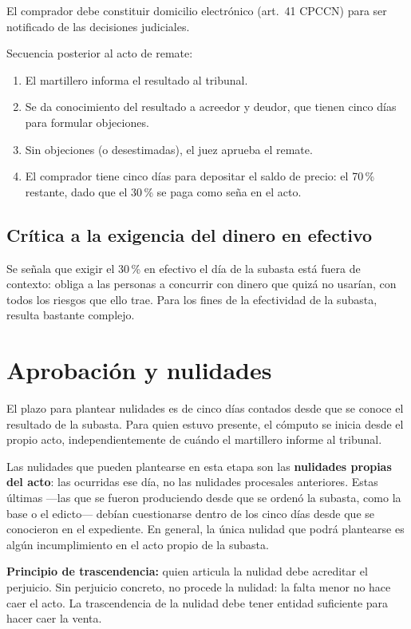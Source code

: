 \documentclass[12pt,oneside]{book}
\begin{document}
El comprador debe constituir domicilio electrónico (art.~41 CPCCN) para ser notificado de las decisiones judiciales.

Secuencia posterior al acto de remate:

\begin{enumerate}
    \item El martillero informa el resultado al tribunal.
    \item Se da conocimiento del resultado a acreedor y deudor, que tienen cinco días para formular objeciones.
    \item Sin objeciones (o desestimadas), el juez aprueba el remate.
    \item El comprador tiene cinco días para depositar el saldo de precio: el 70\,\% restante, dado que el 30\,\% se paga como seña en el acto.
\end{enumerate}

\subsection{Crítica a la exigencia del dinero en efectivo}

Se señala que exigir el 30\,\% en efectivo el día de la subasta está fuera de contexto: obliga a las personas a concurrir con dinero que quizá no usarían, con todos los riesgos que ello trae. Para los fines de la efectividad de la subasta, resulta bastante complejo.

\section{Aprobación y nulidades}

El plazo para plantear nulidades es de cinco días contados desde que se conoce el resultado de la subasta. Para quien estuvo presente, el cómputo se inicia desde el propio acto, independientemente de cuándo el martillero informe al tribunal.

Las nulidades que pueden plantearse en esta etapa son las \textbf{nulidades propias del acto}: las ocurridas ese día, no las nulidades procesales anteriores. Estas últimas ---las que se fueron produciendo desde que se ordenó la subasta, como la base o el edicto--- debían cuestionarse dentro de los cinco días desde que se conocieron en el expediente. En general, la única nulidad que podrá plantearse es algún incumplimiento en el acto propio de la subasta.

\begin{important}
\textbf{Principio de trascendencia:} quien articula la nulidad debe acreditar el perjuicio. Sin perjuicio concreto, no procede la nulidad: la falta menor no hace caer el acto. La trascendencia de la nulidad debe tener entidad suficiente para hacer caer la venta.
\end{important}
\end{document}
